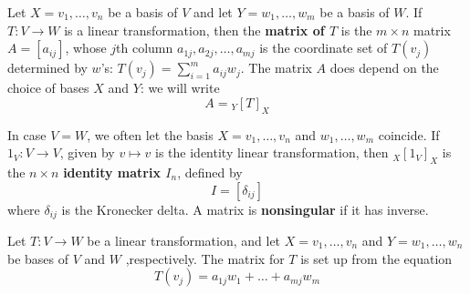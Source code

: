 \documentclass[11pt]{article}
\begin{document}
\begin{definition}[]
Let \(X=v_1,\dots,v_n\) be a basis of \(V\) and let \(Y=w_1,\dots,w_m\) be a
basis of \(W\). If \(T:V\to W\) is a linear transformation, then the \textbf{matrix
of \(T\)} is the \(m\times n\) matrix \(A=[a_{ij}]\), whose \(j\)th column
\(a_{1j},a_{2j},\dots,a_{mj}\) is the coordinate set of \(T(v_j)\)
determined by \(w\)'s: \(T(v_j)=\sum_{i=1}^ma_{ij}w_j\). The matrix \(A\) does
depend on the choice of bases \(X\) and \(Y\): we will write
\begin{equation*}
A={}_Y[T]_X
\end{equation*}

In case \(V=W\), we often let the basis \(X=v_1,\dots,v_n\) and
\(w_1,\dots,w_m\) coincide. If \(1_V:V\to V\), given by \(v\mapsto v\) is
the identity linear transformation, then \({}_X[1_V]_X\) is the
\(n\times n\)  \textbf{identity matrix \(I_n\)}, defined by
\begin{equation*}
I=[\delta_{ij}]
\end{equation*}
where \(\delta_{ij}\) is the Kronecker delta. A matrix is \textbf{nonsingular} if it
has inverse.
\end{definition}

\begin{examplle}[]
Let \(T:V\to W\) be a linear transformation, and let \(X=v_1,\dots,v_n\) and
\(Y=w_1,\dots,w_n\) be bases of \(V\) and \(W\) ,respectively. The matrix for
\(T\) is set up from the equation
\begin{equation*}
T(v_j)=a_{1j}w_1+\dots+a_{mj}w_m
\end{equation*}
\end{examplle}
\end{document}
